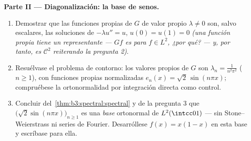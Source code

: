 \begin{problem}
\medskip
\noindent\textbf{Parte II --- Diagonalización: la base de senos.}
\begin{enumerate}[resume]
  \item Demostrar que las funciones propias de $G$ de valor propio
  $\lambda \ne 0$ son, salvo escalares, las soluciones de
  $-\lambda u'' = u$, $u(0) = u(1) = 0$ \emph{(una función propia tiene
  un representante  ---
  $Gf$ es  para
  $f \in L^2$, ¿por qué? --- y, por tanto, es $\mathcal C^2$ reiterando
  la pregunta 2)}. \item Resuélvase el problema de contorno: los valores
  propios de $G$ son $\lambda_n = \frac1{n^2\pi^2}$ ($n \geq 1$), con
  funciones propias normalizadas $e_n(x) =
        \sqrt2\,\sin(n\pi x)$; compruébese la ortonormalidad por
  integración directa como control. \item Concluir
  del~\cref{thm:b3:spectral:spectral} y de la pregunta 3 que
  $\bigl(\sqrt2\sin(n\pi x)\bigr)_{n\geq1}$ es una \emph{base}
  ortonormal de $L^2(\intcc01)$ --- sin Stone--Weierstrass ni series de
  Fourier. Desarróllese $f(x) = x(1-x)$ en esta base y escríbase
   para ella.
\end{enumerate}


\end{problem}
